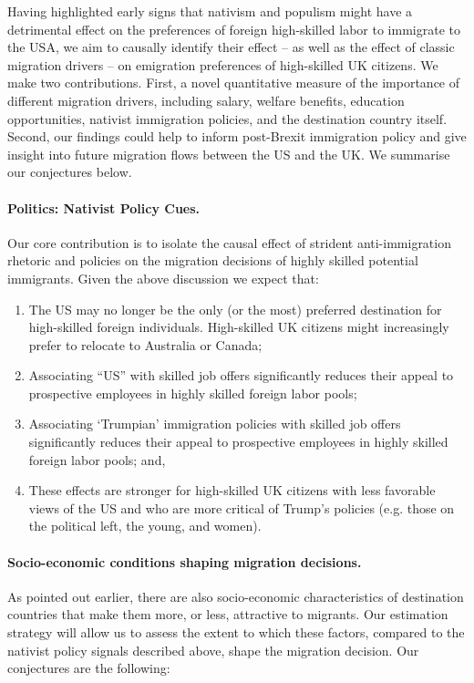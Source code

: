 \documentclass[12pt]{article}
\begin{document}
\par Having highlighted early signs that nativism and populism might have a detrimental effect on the preferences of foreign high-skilled labor to immigrate to the USA, we aim to causally identify their effect -- as well as the effect of classic migration drivers -- on emigration preferences of high-skilled UK citizens. We make two contributions. First, a novel quantitative measure of the importance of different migration drivers, including salary, welfare benefits, education opportunities, nativist immigration policies, and the destination country itself. Second, our findings could help to inform post-Brexit immigration policy and give insight into future migration flows between the US and the UK. We summarise our conjectures below.

\paragraph{Politics: Nativist Policy Cues.} Our core contribution is to isolate the causal effect of strident anti-immigration rhetoric and policies on the migration decisions of highly skilled potential immigrants. Given the above discussion we expect that:

\begin{enumerate}

\item The US may no longer be the only (or the most) preferred destination for high-skilled foreign individuals. High-skilled UK citizens might increasingly prefer to relocate to Australia or Canada;

\item Associating ``US'' with skilled job offers significantly reduces their appeal to prospective employees in highly skilled foreign labor pools;

\item Associating `Trumpian' immigration policies with skilled job offers significantly reduces their appeal to prospective employees in highly skilled foreign labor pools; and,

\item These effects are stronger for high-skilled UK citizens with less favorable views of the US and who are more critical of Trump's policies (e.g. those on the political left, the young, and women).


\end{enumerate}

\paragraph{Socio-economic conditions shaping migration decisions.} As pointed out earlier, there are also socio-economic characteristics of destination countries that make them more, or less, attractive to migrants. Our estimation strategy will allow us to assess the extent to which these factors, compared to the nativist policy signals described above, shape the migration decision. Our conjectures are the following:  
\end{document}
